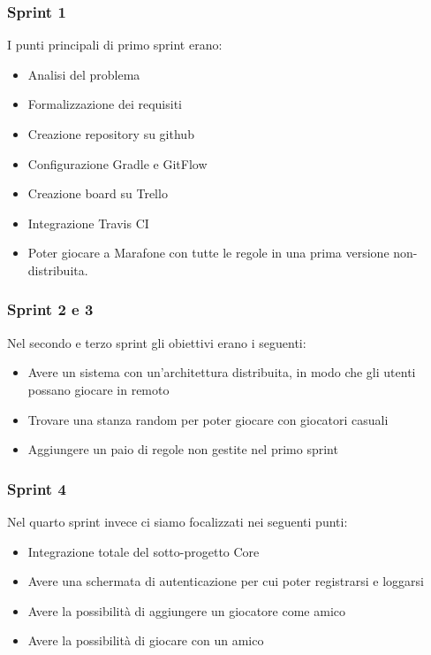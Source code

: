 \subsubsection{Sprint 1}
I punti principali di primo sprint erano:
 \begin {itemize}
  \item Analisi del problema
  \item Formalizzazione dei requisiti
  \item Creazione repository su github
  \item Configurazione Gradle e GitFlow
  \item Creazione board su Trello
  \item Integrazione Travis CI
  \item Poter giocare a Marafone con tutte le regole in una prima versione non-distribuita.
\end {itemize}

\subsubsection{Sprint 2 e 3}
Nel secondo e terzo sprint gli obiettivi erano i seguenti:
 \begin {itemize}
  \item Avere un sistema con un'architettura distribuita, in modo che gli utenti possano giocare in remoto
  \item Trovare una stanza random per poter giocare con giocatori casuali
  \item Aggiungere un paio di regole non gestite nel primo sprint
\end {itemize} 

\subsubsection{Sprint 4}
Nel quarto sprint invece ci siamo focalizzati nei seguenti punti:
 \begin {itemize}
  \item Integrazione totale del sotto-progetto Core
  \item Avere una schermata di autenticazione per cui poter registrarsi e loggarsi
  \item Avere la possibilità di aggiungere un giocatore come amico
  \item Avere la possibilità di giocare con un amico
\end {itemize} 

